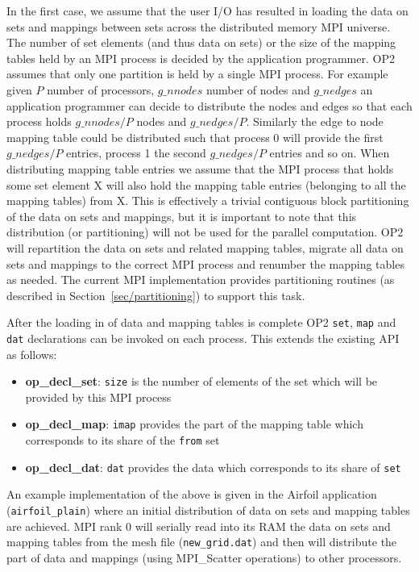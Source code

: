 \documentclass[11pt]{article}
\begin{document}
In the first case, we assume that the user I/O has resulted in loading the data
on sets and mappings between sets across the distributed memory MPI universe.
The number of set elements (and thus data on sets) or the size of the mapping
tables held by an MPI process is decided by the application programmer. OP2
assumes that only one partition is held by a single MPI process. For example
given $P$ number of processors, $g\_nnodes$ number of nodes and $g\_nedges$
an application programmer can decide to distribute the nodes and edges so that
each process holds $g\_nnodes/P$ nodes and $g\_nedges/P$. Similarly the edge to
node mapping table could be distributed such that process 0 will provide the
first $g\_nedges/P$ entries, process 1 the second $g\_nedges/P$ entries and so
on. When distributing mapping table entries we assume that the MPI process that
holds some set element X will also hold the mapping table entries (belonging
to all the mapping tables) from X. This is effectively a trivial contiguous
block partitioning of the data on sets and mappings, but it is important to note
that this distribution (or partitioning) will not be used for the parallel
computation. OP2 will repartition the data on sets and related mapping tables,
migrate all data on sets and mappings to the correct MPI process and renumber
the mapping tables as needed. The current MPI implementation provides
partitioning routines (as described in Section~\ref{sec/partitioning}) to
support this task.

\noindent After the loading in of data and mapping tables is complete OP2
\texttt{set}, \texttt{map} and \texttt{dat} declarations can be invoked on each
process. This extends the existing API as follows:
\begin{itemize}
\item {\bf op\_decl\_set}: {\tt size} is the number of elements of the set which
will be provided by this MPI process

\item {\bf op\_decl\_map}: {\tt imap} provides the part of the mapping table
which corresponds to its share of the {\tt from} set

\item {\bf op\_decl\_dat}: {\tt dat} provides the data which corresponds to its
share of {\tt set}
\end{itemize}
\noindent An example implementation of the above is given in the Airfoil application (\texttt{airfoil\_plain}) where an
initial  distribution of data on sets and mapping tables are achieved. MPI rank 0 will serially read into its RAM the
data on sets and mapping tables from the mesh file (\texttt{new\_grid.dat}) and then will distribute the part of data
and mappings (using MPI\_Scatter operations) to other processors.\\
\end{document}
